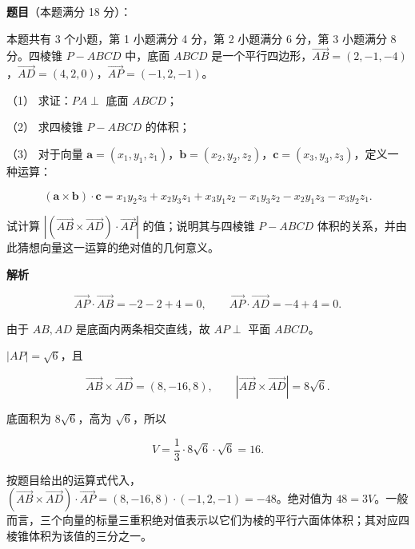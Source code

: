 \begin{answer}

\textbf{题目}（本题满分 18 分）：

本题共有 3 个小题，第 1 小题满分 4 分，第 2 小题满分 6 分，第 3 小题满分 8 分。四棱锥 $P-ABCD$ 中，底面 $ABCD$ 是一个平行四边形，$\overrightarrow{AB}=(2,-1,-4)$，$\overrightarrow{AD}=(4,2,0)$，$\overrightarrow{AP}=(-1,2,-1)$。

（1） 求证：$PA\perp$ 底面 $ABCD$；

（2） 求四棱锥 $P-ABCD$ 的体积；

（3） 对于向量 $\mathbf{a}=(x_1,y_1,z_1)$，$\mathbf{b}=(x_2,y_2,z_2)$，$\mathbf{c}=(x_3,y_3,z_3)$，定义一种运算：

\nopagebreak[4]
\[
(\mathbf{a}\times\mathbf{b})\cdot\mathbf{c}=x_1y_2z_3+x_2y_3z_1+x_3y_1z_2-x_1y_3z_2-x_2y_1z_3-x_3y_2z_1.
\]

试计算 $\left|(\overrightarrow{AB}\times\overrightarrow{AD})\cdot\overrightarrow{AP}\right|$ 的值；说明其与四棱锥 $P-ABCD$ 体积的关系，并由此猜想向量这一运算的绝对值的几何意义。

\textbf{解析}


\nopagebreak[4]
\[
\overrightarrow{AP}\cdot\overrightarrow{AB}=-2-2+4=0,\qquad
\overrightarrow{AP}\cdot\overrightarrow{AD}=-4+4=0.
\]

由于 $AB,AD$ 是底面内两条相交直线，故 $AP\perp$ 平面 $ABCD$。


$|AP|=\sqrt6$，且

\nopagebreak[4]
\[
\overrightarrow{AB}\times\overrightarrow{AD}=(8,-16,8),\qquad
|\overrightarrow{AB}\times\overrightarrow{AD}|=8\sqrt6.
\]

底面积为 $8\sqrt6$，高为 $\sqrt6$，所以

\nopagebreak[4]
\[
V=\frac13\cdot8\sqrt6\cdot\sqrt6=16.
\]


按题目给出的运算式代入，$(\overrightarrow{AB}\times\overrightarrow{AD})\cdot\overrightarrow{AP}=(8,-16,8)\cdot(-1,2,-1)=-48$。绝对值为 $48=3V$。一般而言，三个向量的标量三重积绝对值表示以它们为棱的平行六面体体积；其对应四棱锥体积为该值的三分之一。




\end{answer}
